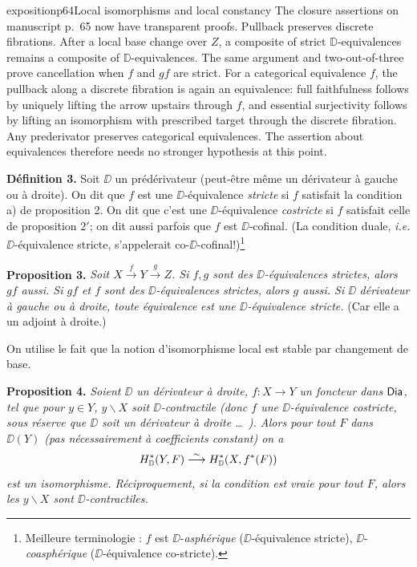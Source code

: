 \begin{dcomment}{exposition}{p64}{Local isomorphisms and local constancy}
The closure assertions on manuscript p.~65 now have transparent proofs. Pullback preserves discrete fibrations. After a local base change over $Z$, a composite of strict $\mathbb D$-equivalences remains a composite of $\mathbb D$-equivalences. The same argument and two-out-of-three prove cancellation when $f$ and $gf$ are strict. For a categorical equivalence $f$, the pullback along a discrete fibration is again an equivalence: full faithfulness follows by uniquely lifting the arrow upstairs through $f$, and essential surjectivity follows by lifting an isomorphism with prescribed target through the discrete fibration. Any prederivator preserves categorical equivalences. The assertion about equivalences therefore needs no stronger hypothesis at this point.
\end{dcomment}


\noindent\textbf{Définition 3.} Soit $\DD$ un prédérivateur (peut-être même un dérivateur à gauche ou à droite). On dit que $f$ est une $\DD$-équivalence \textit{stricte} si $f$ satisfait la condition a) de proposition 2. On dit que c'est une $\DD$-équivalence \textit{costricte} si $f$ satisfait celle de proposition $2'$; on dit aussi parfois que $f$ est $\DD$-cofinal. (La condition duale, \textit{i.e.} $\DD$-équivalence stricte, s'appelerait co-$\DD$-cofinal!)\footnote[27]{Meilleure terminologie : $f$ est $\DD$-\textit{asphérique} ($\DD$-équivalence stricte), $\DD$-\textit{coasphérique} ($\DD$-équivalence co-stricte).} %

\noindent\textbf{Proposition 3.} \textit{Soit $X \overset{f}{\to} Y \overset{g}{\to} Z$. Si $f, g$ sont des $\DD$-équivalences strictes, alors $gf$ aussi. Si $gf$ et $f$ sont des $\DD$-équivalences strictes, alors $g$ aussi. Si $\DD$} \textit{dérivateur à gauche ou à droite, toute équivalence} \textit{est une $\DD$-équivalence stricte.} (Car elle a un adjoint à droite.)

On utilise le fait que la notion d'isomorphisme local est stable par changement de base.

\noindent{}

\noindent\textbf{Proposition 4.} \textit{Soient $\DD$ un dérivateur à droite, $f : X \to Y$ un foncteur dans} $\mathsf{Dia}$\textit{, tel que pour $y \in Y$, $y\backslash X$ soit $\DD$-contractile (donc $f$ une $\DD$-équivalence costricte, sous réserve que $\DD$ soit un dérivateur à droite \ldots\ ). Alors pour tout $F$ dans $\DD(Y)$ (pas nécessairement à coefficients constant) on a} %
\[
H^*_{\mathbb{D}}(Y, F) \overset{\sim}{\longrightarrow} H^*_{\mathbb{D}}(X, f^*(F))
\]
\textit{est un isomorphisme. Réciproquement, si la condition est vraie pour tout $F$, alors les $y\backslash X$ sont $\DD$-contractiles.}

